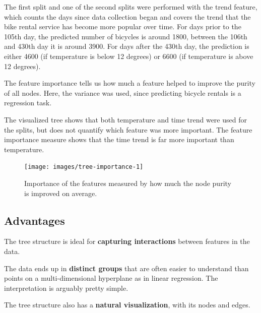 \documentclass[
  12pt,
]{krantz}
\begin{document}
The first split and one of the second splits were performed with the trend feature, which counts the days since data collection began and covers the trend that the bike rental service has become more popular over time.
For days prior to the 105th day, the predicted number of bicycles is around 1800, between the 106th and 430th day it is around 3900.
For days after the 430th day, the prediction is either 4600 (if temperature is below 12 degrees) or 6600 (if temperature is above 12 degrees).

The feature importance tells us how much a feature helped to improve the purity of all nodes.
Here, the variance was used, since predicting bicycle rentals is a regression task.

The visualized tree shows that both temperature and time trend were used for the splits, but does not quantify which feature was more important.
The feature importance measure shows that the time trend is far more important than temperature.

\begin{figure}

{\centering \texttt{[image: images/tree-importance-1]} 

}

\caption{Importance of the features measured by how much the node purity is improved on average.}\label{fig:tree-importance}
\end{figure}

\hypertarget{advantages-2}{%
\subsection{Advantages}\label{advantages-2}}

The tree structure is ideal for \textbf{capturing interactions} between features in the data.

The data ends up in \textbf{distinct groups} that are often easier to understand than points on a multi-dimensional hyperplane as in linear regression.
The interpretation is arguably pretty simple.

The tree structure also has a \textbf{natural visualization}, with its nodes and edges.
\end{document}
